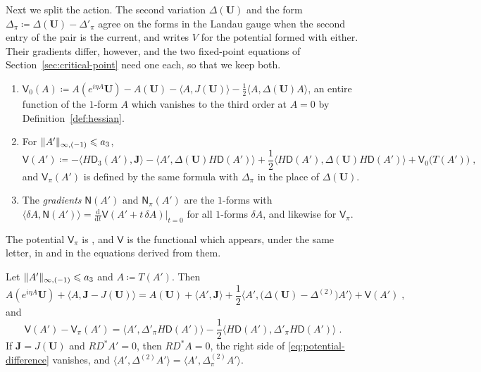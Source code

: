 \documentclass[11pt]{preprint}
\newcommand{\dd}{\mathrm{d}}
\DeclarePairedDelimiter{\norm}{\lVert}{\rVert}
\numberwithin{equation}{section}
\begin{document}
Next we split the action. The second variation $\Delta(\mathbf U)$ and the form $\Delta_\pi \coloneqq \Delta(\mathbf U) - \Delta'_\pi$ agree on the forms in the Landau gauge when the second entry of the pair is the current, and \cite{BalabanVAR} writes $V$ for the potential formed with either. Their gradients differ, however, and the two fixed-point equations of Section~\ref{sec:critical-point} need one each, so that we keep both.

\begin{definition}\label{def:potential}
\begin{enumerate}[label=(\roman*)]
\item $\mathsf V_0(A) \coloneqq A(e^{i\eta A}\mathbf U) - A(\mathbf U) - \langle A, J(\mathbf U)\rangle - \frac{1}{2}\langle A, \Delta(\mathbf U)A\rangle$, an entire function of the $1$-form $A$ which vanishes to the third order at $A = 0$ by Definition~\ref{def:hessian}.
\item For $\norm{A'}_{\infty,(-1)} \leqslant a_3$,
\begin{equation}\label{eq:potential}
    \mathsf V(A') \coloneqq -\langle H\mathsf D_3(A'), \mathbf J\rangle - \langle A', \Delta(\mathbf U)H\mathsf D(A')\rangle + \frac{1}{2}\langle H\mathsf D(A'), \Delta(\mathbf U)H\mathsf D(A')\rangle + \mathsf V_0\bigl(T(A')\bigr)\;,
\end{equation}
and $\mathsf V_\pi(A')$ is defined by the same formula with $\Delta_\pi$ in the place of $\Delta(\mathbf U)$.
\item The \emph{gradients} $\mathsf N(A')$ and $\mathsf N_\pi(A')$ are the $1$-forms with $\langle\delta A, \mathsf N(A')\rangle = \frac{\dd}{\dd t}\mathsf V(A' + t\,\delta A)|_{t=0}$ for all $1$-forms $\delta A$, and likewise for $\mathsf V_\pi$.
\end{enumerate}
\end{definition}

The potential $\mathsf V_\pi$ is \cite[(80), p.~290]{BalabanVAR}, and $\mathsf V$ is the functional which appears, under the same letter, in \cite[(127), (128), p.~297]{BalabanVAR} and in the equations derived from them.

\begin{lemma}\label{lem:functional}
Let $\norm{A'}_{\infty,(-1)} \leqslant a_3$ and $A \coloneqq T(A')$. Then
\begin{equation}\label{eq:functional}
    A(e^{i\eta A}\mathbf U) + \langle A, \mathbf J - J(\mathbf U)\rangle = A(\mathbf U) + \langle A', \mathbf J\rangle + \frac{1}{2}\bigl\langle A', \bigl(\Delta(\mathbf U) - \Delta^{(2)}\bigr)A'\bigr\rangle + \mathsf V(A')\;,
\end{equation}
and
\begin{equation}\label{eq:potential-difference}
    \mathsf V(A') - \mathsf V_\pi(A') = \langle A', \Delta'_\pi H\mathsf D(A')\rangle - \frac{1}{2}\langle H\mathsf D(A'), \Delta'_\pi H\mathsf D(A')\rangle\;.
\end{equation}
If $\mathbf J = J(\mathbf U)$ and $RD^*A' = 0$, then $RD^*A = 0$, the right side of \eqref{eq:potential-difference} vanishes, and $\langle A', \Delta^{(2)}A'\rangle = \langle A', \Delta^{(2)}_\pi A'\rangle$.
\end{lemma}
\end{document}
